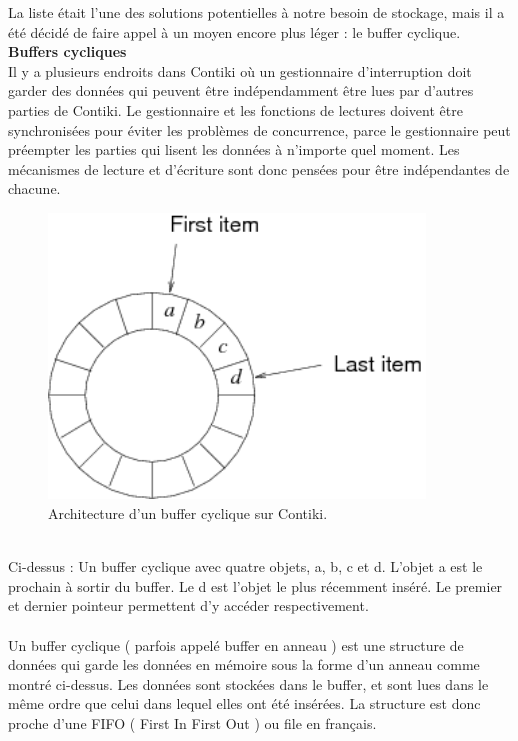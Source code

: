 				La liste était l'une des solutions potentielles à notre besoin de stockage, mais il a été décidé de faire appel à un moyen encore plus léger : le buffer cyclique.
			\clearpage
			\textbf{Buffers cycliques}\\
				Il y a plusieurs endroits dans Contiki où un gestionnaire d'interruption doit garder des données qui peuvent être indépendamment être lues par d'autres parties de Contiki. Le gestionnaire et les fonctions de lectures doivent être synchronisées pour éviter les problèmes de concurrence, parce le gestionnaire peut préempter les parties qui lisent les données à n'importe quel moment. Les mécanismes de lecture et d'écriture sont donc pensées pour être indépendantes de chacune.\\
				\begin{figure}[htp]
					\centering
					\includegraphics[width=10cm]{images/ringbuf}
					\caption{Architecture d'un buffer cyclique sur Contiki.}
					\label{fig:ringbuf}
				\end{figure}\\
				Ci-dessus : Un buffer cyclique avec quatre objets, a, b, c et d. L'objet a est le prochain à sortir du buffer. Le d est l'objet le plus récemment inséré. Le premier et dernier pointeur permettent d'y accéder respectivement.\\\\
				Un buffer cyclique ( parfois appelé buffer en anneau ) est une structure de données qui garde les données en mémoire sous la forme d'un anneau comme montré ci-dessus. Les données sont stockées dans le buffer, et sont lues dans le même ordre que celui dans lequel elles ont été insérées. La structure est donc proche d'une FIFO ( First In First Out ) ou file en français.\\
